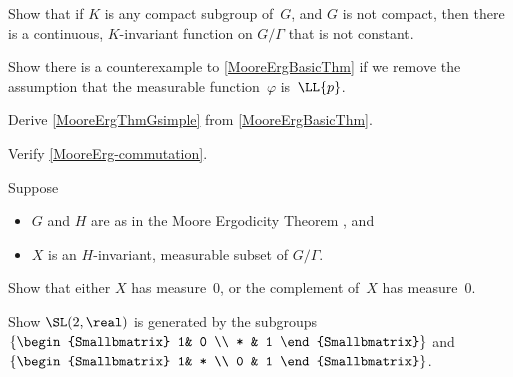 \begin{exercises}

\item \label{ExistKInvtFuncs}
Show that if $K$ is any compact subgroup of~$G$, and $G$ is not compact, then there is a continuous, $K$-invariant function on $G/\Gamma$ that is not constant.

\item \label{ExistInvtNotLp}
Show there is a counterexample to \cref{MooreErgBasicThm} if we remove the assumption that the measurable function~$\varphi$ is~$\LL{p}$.

\item \label{MooreLattFromDiscreteLp}
Derive \cref{MooreErgThmGsimple} from \cref{MooreErgBasicThm}.

\item \label{MooreErg-commutationEx}
Verify \cref{MooreErg-commutation}.

\item \label{MooreErgBasicInvtSetEx}
Suppose
	\begin{itemize} 
	\item $G$ and $H$ are as in the Moore Ergodicity Theorem ,
	and
	\item $X$ is an $H$-invariant, measurable subset of $G/\Gamma$.
	\end{itemize}
Show that either $X$ has measure~$0$, or the complement of~$X$ has measure~$0$.

\item \label{ElemsGenSL2R}
Show $\SL(2,\real)$ is generated by the subgroups
$\left\{\begin{Smallbmatrix} 1& 0 \\ * & 1 \end{Smallbmatrix}\right\}$ and $\left\{\begin{Smallbmatrix} 1& * \\ 0 & 1 \end{Smallbmatrix}\right\}$.


\end{exercises}
